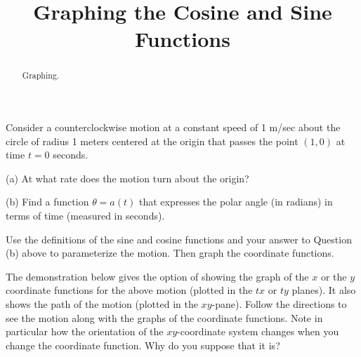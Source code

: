 \documentclass{ximera}
\title{Graphing the Cosine and Sine Functions}
\begin{document}
\begin{abstract}
Graphing.
\end{abstract}
\maketitle



Consider a counterclockwise motion at a constant speed of 1 m/sec about the circle of radius 1 meters centered at the origin that passes the point $(1,0)$ at time $t=0$ seconds.

\begin{question}
(a) At what rate does the motion turn about the origin?

(b) Find a function $\theta = a(t)$ that expresses the polar angle (in radians) in terms of time (measured in seconds).
\end{question}

Use the definitions of the sine and cosine functions and your answer to Question (b) above to parameterize the motion. Then graph the coordinate functions.

The demonstration below gives the option of showing the graph of the $x$ or the $y$ coordinate functions for the above motion (plotted in the $tx$ or $ty$ planes). It also shows the path of the motion (plotted in the $xy$-pane). Follow the directions to see the motion along with the graphs of the coordinate functions. Note in particular how the orientation of the $xy$-coordinate system changes when you change the coordinate function. Why do you suppose that it is?

\begin{exploration}
 
\begin{onlineOnly}
    \begin{center}
\end{center}
\end{onlineOnly}
\end{exploration}
\end{document}
